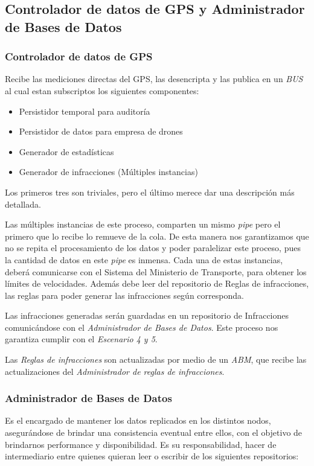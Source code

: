 \subsection{Controlador de datos de GPS y Administrador de Bases de Datos}

\subsubsection{Controlador de datos de GPS}

Recibe las mediciones directas del GPS, las desencripta y las publica en un \textit{BUS} 
al cual estan subscriptos los siguientes componentes:

\begin{itemize}
  \item Persistidor temporal para auditoría
  \item Persistidor de datos para empresa de drones
  \item Generador de estadísticas
  \item Generador de infracciones (Múltiples instancias)
\end{itemize}

Los primeros tres son triviales, pero el último merece dar una descripción más 
detallada.

Las múltiples instancias de este proceso, comparten un mismo \textit{pipe} pero 
el primero que lo recibe lo remueve de la cola. De esta manera nos garantizamos 
que no se repita el procesamiento de los datos y poder paralelizar este 
proceso, pues la cantidad de datos en este \textit{pipe} es inmensa.
Cada una de estas instancias, deberá comunicarse con el Sistema del Ministerio 
de Transporte, para obtener los límites de velocidades. Además debe leer del 
repositorio de Reglas de infracciones, las reglas para poder generar las 
infracciones según corresponda.

Las infracciones generadas serán guardadas en un repositorio de Infracciones 
comunicándose con el \textit{Administrador de Bases de Datos}.
Este proceso nos garantiza cumplir con el \textit{Escenario 4 y 5}.

Las \textit{Reglas de infracciones} son actualizadas por medio de un 
\textit{ABM}, que recibe las actualizaciones del \textit{Administrador de reglas de 
infracciones}.


\subsubsection{Administrador de Bases de Datos}
Es el encargado de mantener los datos replicados en los distintos nodos, 
asegurándose de brindar una consistencia eventual entre ellos, con el objetivo 
de brindarnos performance y disponibilidad.
Es su responsabilidad, hacer de intermediario entre quienes quieran leer o 
escribir de los siguientes repositorios:

